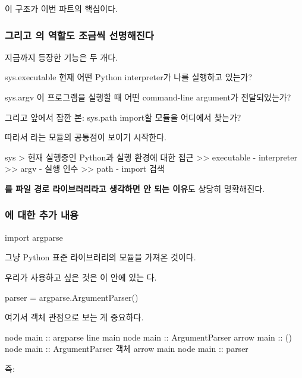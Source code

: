 이 구조가 이번 파트의 핵심이다.

\subsubsection{그리고 의 역할도 조금씩 선명해진다}

지금까지 등장한  기능은 두 개다.

\begin{dhksmry}
    sys.executable
    \ra 현재 어떤 Python interpreter가 나를 실행하고 있는가?

    sys.argv
    \ra 이 프로그램을 실행할 때 어떤 command-line argument가 전달되었는가?

    그리고 앞에서 잠깐 본:
    sys.path
    \ra import할 모듈을 어디에서 찾는가?
\end{dhksmry}

따라서 라는 모듈의 공통점이 보이기 시작한다.

\begin{dhkdir}
sys
> 현재 실행중인 Python과 실행 환경에 대한 접근
>> executable - interpreter
>> argv - 실행 인수
>> path - import 검색
\end{dhkdir}

\textbf{를 파일 경로 라이브러리라고 생각하면 안 되는 이유}도 상당히 명확해진다.

\subsubsection{에 대한 추가 내용}

\begin{dhkcode}
import argparse
\end{dhkcode}

그냥 Python 표준 라이브러리의  모듈을 가져온 것이다.

우리가 사용하고 싶은 것은 이 안에 있는 다.

\begin{dhkcode}
parser = argparse.ArgumentParser()
\end{dhkcode}

여기서 객체 관점으로 보는 게 중요하다.

\begin{dhkbranch}[in=8]
node main :: argparse
line main
node main :: ArgumentParser
arrow main :: ()
node main :: ArgumentParser 객체
arrow main
node main :: parser
\end{dhkbranch}

즉:

